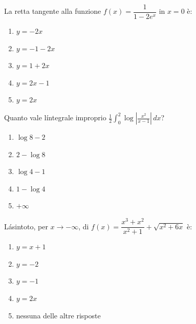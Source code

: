 \begin{quiz}
La retta tangente alla funzione $f(x)=\dfrac1{1-2e^x}$ in $x=0$ \`e:
\begin{enumerate}
\item $y=-2x$
\item $y=-1-2x$
\item $y=1+2x$
\item $y=2x-1$
\item $y=2x$
\end{enumerate}
\end{quiz}

\begin{quiz}
Quanto vale l\'integrale improprio $\displaystyle\frac12\int_0^2\log\left|\frac{x^2}{x-1}\right|\,dx$?
\begin{enumerate}
\item $\log8-2$
\item $2-\log8$
\item $\log4-1$
\item $1-\log4$
\item $+\infty$
\end{enumerate}
\end{quiz}

\begin{quiz}
L\'asintoto, per $x\to-\infty$, di $f(x)=\dfrac{x^3+x^2}{x^2+1}+\sqrt{x^2+6x}$ \`e:
\begin{enumerate}
\item $y=x+1$
\item $y=-2$
\item $y=-1$
\item $y=2x$
\item nessuna delle altre risposte
\end{enumerate}
\end{quiz}

